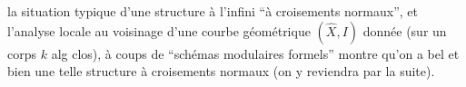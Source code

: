la situation typique d'une structure à l'infini ``à croisements normaux'', et l'analyse locale  au voisinage d'une courbe géométrique $(\widehat X,I)$ donnée (sur un corps $k$ alg clos), à coups de ``schémas modulaires  formels'' montre qu'on a bel et bien une telle structure à croisements normaux (on y reviendra par la suite).
